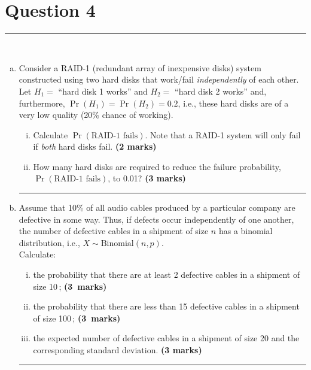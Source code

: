 \documentclass[12pt]{article}
\begin{document}
\section*{Question 4 }
\noindent\rule{\linewidth}{1pt}
\quad\\[-0.5cm]
\begin{enumerate}[a)]
\item Consider a RAID-1 (redundant array of inexpensive disks) system constructed using two hard disks that work/fail \emph{independently} of each other. Let $H_1 =$ ``hard disk 1 works'' and $H_2 =$ ``hard disk 2 works'' and, furthermore, $\Pr(H_1) = \Pr(H_2) = 0.2$, i.e., these hard disks are of a very low quality (20\% chance of working).
    \begin{enumerate}[i)]\itemsep0.3cm
    \item Calculate $\Pr(\text{RAID-1 fails})$. Note that a RAID-1 system will only fail if \emph{both} hard disks fail. \hfill{\scriptsize \bf (2 marks)}
    \item How many hard disks are required to reduce the failure  probability, $\Pr(\text{RAID-1 fails})$, to 0.01? \hfill{\scriptsize \bf (3 marks)}
    \end{enumerate}
\begin{center}\noindent\rule{0.4\linewidth}{0.5pt}\end{center}
\item Assume that 10\% of all audio cables produced by a particular company are defective in some way. Thus, if defects occur independently of one another, the number of defective cables in a shipment of size $n$ has a binomial distribution, i.e., $X \sim \text{Binomial}(n,p)$.\\[0.3cm]
    Calculate:
    \begin{enumerate}[i)]\itemsep0.3cm
    \item the probability that there are at least 2 defective cables in a shipment of size 10\,; \hfill{\mbox{\scriptsize \bf (3 marks)}}
    \item the probability that there are less than 15 defective cables in a shipment of size 100\,; \hfill{\mbox{\scriptsize \bf (3 marks)}}
    \item the expected number of defective cables in a shipment of size 20 and the corresponding standard deviation. \hfill{\scriptsize \bf (3 marks)}
    \end{enumerate}
    \begin{center}\noindent\rule{0.4\linewidth}{0.5pt}\end{center}

\end{enumerate}
\end{document}
